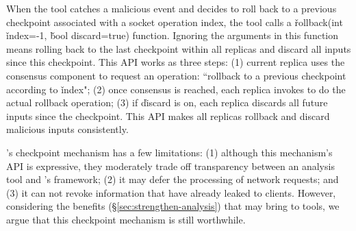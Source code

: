 When the tool catches a malicious event and decides to roll back to a previous
checkpoint associated with a socket operation index, the tool calls a 
\v{rollback(int} \v{index=-1,} \v{bool discard=true)} function. Ignoring the 
arguments in this function means rolling back to the last checkpoint within all 
replicas and discard all inputs since this checkpoint. This API works as three 
steps: (1) current replica uses the \paxos consensus component to request an 
operation: ``rollback to a previous checkpoint according to \v{index}"; (2) 
once consensus is reached, each replica invokes \criu to do the actual rollback 
operation; (3) if \v{discard} is on, each replica discards all future inputs 
since the checkpoint. This API makes all replicas rollback and discard 
malicious inputs consistently.


\xxx's checkpoint mechanism has a few limitations: (1) although this mechanism's 
API is expressive, they moderately trade off transparency between an analysis 
tool and \xxx's framework; (2) it may defer the processing of network requests; 
and (3) it can not revoke information that have already leaked to clients. 
However, considering the benefits (\S\ref{sec:strengthen-analysis}) that \xxx 
may bring to tools, we argue that this checkpoint mechanism is still worthwhile.





